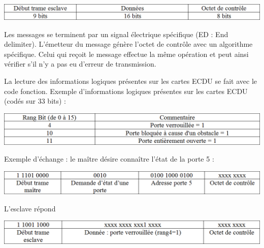\documentclass[10pt]{article}
\begin{document}
\begin{center}
\includegraphics[width=.95\textwidth]{images/fig_26}
\end{center}

Les messages se terminent par un signal électrique spécifique (ED : End delimiter).
L'émetteur du message génère l'octet de contrôle avec un algorithme spécifique. Celui qui reçoit le message effectue la même opération et peut ainsi vérifier s’il n'y a pas eu d'erreur de transmission.

La lecture des informations logiques présentes sur les cartes ECDU se fait avec le code fonction.
Exemple d'informations logiques présentes sur les cartes ECDU (codés sur 33 bits) :

\begin{center}
\includegraphics[width=.95\textwidth]{images/fig_27}
\end{center}


Exemple d'échange : le maître désire connaître l'état de la porte 5 :

\begin{center}
\includegraphics[width=.95\textwidth]{images/fig_28}
\end{center}


L'esclave répond

\begin{center}
\includegraphics[width=.95\textwidth]{images/fig_29}
\end{center}
\end{document}
